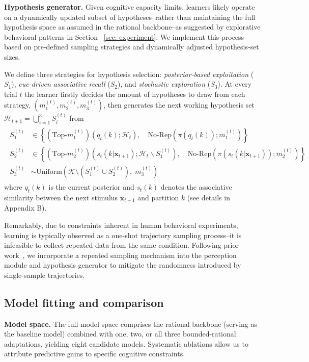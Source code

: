 \textbf{Hypothesis generator.} Given cognitive capacity limits, learners likely operate on a dynamically updated subset of hypotheses--rather than maintaining the full hypothesis space as assumed in the rational backbone--as suggested by explorative behavioral patterns in Section ~\ref{sec: experiment}. We implement this process based on pre-defined sampling strategies and dynamically adjusted hypothesis-set sizes. 

We define three strategies for hypothesis selection: \textit{posterior-based exploitation} ($S_1$), \textit{cue-driven associative recall} ($S_2$), and \textit{stochastic exploration} ($S_3$). At every trial $t$ the learner firstly decides the amount of hypotheses to draw from each strategy, $(m_1^{(t)}, m_2^{(t)}, m_3^{(t)})$, then generates the next working hypothesis set $\mathcal H_{t+1}=\bigcup_{i=1}^3S_i^{(t)}$ from
\begin{align}
   \begin{aligned}  
   S_1^{(t)} &\in\left\{(\text{Top-}m_1^{(t)})(q_t(k);\mathcal{H}_{t}),\quad \text{No-Rep}(\pi(q_t(k)); m_1^{(t)})\right\}\\
   S_2^{(t)} &\in\left\{(\text{Top-}m_2^{(t)})(s_t(k|\mathbf{x}_{t+1});\mathcal{H}_{t}\backslash{S_1^{(t)}}),\quad \text{No-Rep}(\pi(s_t(k|\mathbf{x}_{t+1})); m_2^{(t)})\right\}\\
   S_3^{(t)} &\sim\text{Uniform}\!\left(\mathcal K\setminus(S_1^{(t)}\cup S_2^{(t)}),\;m_3^{(t)}\right) 
   \end{aligned}
   \tag{5}
\end{align}
where $q_t(k)$ is the current posterior and $s_t(k)$ denotes the associative similarity between the next stimulus $\mathbf x_{t+1}$ and partition $k$ (see details in Appendix B).

Remarkably, due to constraints inherent in human behavioral experiments, learning is typically observed as a one-shot trajectory sampling process--it is infeasible to collect repeated data from the same condition. Following prior work~\cite{gershman2015computational}, we incorporate a repeated sampling mechanism into the perception module and hypothesis generator to mitigate the randomness introduced by single-sample trajectories.


\subsection{Model fitting and comparison} \label{sec:3.3}
\textbf{Model space.} The full model space comprises the rational backbone (serving as the baseline model) combined with one, two, or all three bounded-rational adaptations, yielding eight candidate models. Systematic ablations allow us to attribute predictive gains to specific cognitive constraints.

